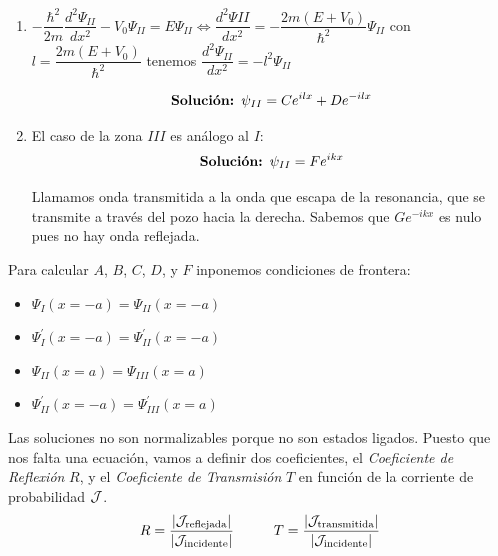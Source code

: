 \documentclass{report}
\begin{document}
{\begin{enumerate}
                  \[\text{\textbf{Solución: }}\psi_I=Ae^{ikx}+Be^{-ikx}\]

                  Donde el término $Ae^{ikx}$ representa a una partícula incidente desde la izquierda,
                  mientras que el término $Be^{-ikx}$ representa a una partícula reflejada. Puesto que
                  nos encontramos un pozo, la reflexión puede sucederse repetidas veces
                  dentro del pozo, generando una resonancia.
            \item $-\dfrac{\hbar^2}{2m}\dfrac{d^2\Psi_{II}}{dx^2}-V_0\Psi_{II}=E\Psi_{II}
                  \Longleftrightarrow\dfrac{d^2\Psi{II}}{dx^2}=-\dfrac{2m(E+V_0)}{\hbar^2}\Psi_{II}$
                  con $l=\dfrac{2m(E+V_0)}{\hbar^2}$ tenemos $\dfrac{d^2\Psi_{II}}{dx^2}=-l^2\Psi_{II}$

                  \[\text{\textbf{Solución: }}\psi_{II}=Ce^{ilx}+De^{-ilx}\]

            \item El caso de la zona $III$ es análogo al $I$:
                  \[\text{\textbf{Solución: }}\psi_{II}=Fe^{ikx}\]

                  Llamamos onda transmitida a la onda que escapa de la resonancia, que se
                  transmite a través del pozo hacia la derecha. Sabemos que $Ge^{-ikx}$ es
                  nulo pues no hay onda reflejada.
          \end{enumerate}
          Para calcular $A$, $B$, $C$, $D$, y $F$ inponemos condiciones de frontera:
          \begin{itemize}
            \item $\Psi_I(x=-a)=\Psi_{II}(x=-a)$
            \item $\Psi^\prime_I(x=-a)=\Psi^\prime_{II}(x=-a)$
            \item $\Psi_{II}(x=a)=\Psi_{III}(x=a)$
            \item $\Psi^\prime_{II}(x=-a)=\Psi^\prime_{III}(x=a)$
          \end{itemize}
          Las soluciones no son normalizables porque no son estados ligados.
          Puesto que nos falta una ecuación, vamos a definir dos coeficientes,
          el \textit{Coeficiente de Reflexión} $R$, y el \textit{Coeficiente
          de Transmisión} $T$ en función de la corriente de probabilidad $\mathcal{J}$.
          \[R=\dfrac{\lvert\mathcal{J}_{\text{reflejada}}\rvert}{\lvert\mathcal{J}_{\text{incidente}}\rvert}
          \hspace{1cm}T=\dfrac{\lvert\mathcal{J}_{\text{transmitida}}\rvert}{\lvert\mathcal{J}_{\text{incidente}}\rvert}\]
      
}
\end{document}
